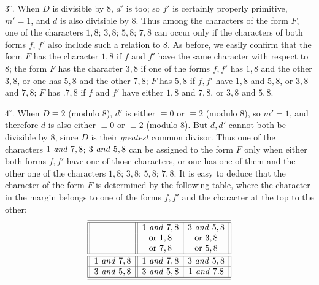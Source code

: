 $3^{\circ}$. When $D$ is divisible by $8$, $d'$ is too; so $f'$ is certainly properly primitive, $m'=1$, and $d$ is also divisible by $8$. Thus among the characters of the form $F$, one of the characters $1,8$; $3,8$; $5,8$; $7,8$ can occur only if the characters of both forms $f$, $f'$ also include such a relation to $8$. As before, we easily confirm that the form $F$ has the character $1,8$ if $f$ and $f'$ have the same character with respect to $8$; the form $F$ has the character $3,8$ if one of the forms $f,f'$ has $1,8$ and the other $3,8$, or one has $5,8$ and the other $7,8$; $F$ has $5,8$ if $f,f'$ have $1,8$ and $5,8$, or $3,8$ and $7,8$; $F$ has $.7,8$ if $f$ and $f'$ have either $1,8$ and $7,8$, or $3,8$ and $5,8$.

$4^{\circ}$. When $D\equiv2$ (modulo $8$), $d'$ is either $\equiv0$ or $\equiv2$ (modulo $8$), so $m'=1$, and therefore $d$ is also either $\equiv0$ or $\equiv2$ (modulo $8$). But $d,d'$ cannot both be divisible by $8$, since $D$ is their \textit{greatest} common divisor. Thus one of the characters $1\text{ \textit{and} }7,8$; $3\text{ \textit{and} }5,8$ can be assigned to the form $F$ only when either both forms $f,f'$ have one of those characters, or one has one of them and the other one of the characters $1,8$; $3,8$; $5,8$; $7,8$. It is easy to deduce that the character of the form $F$ is determined by the following table, where the character in the margin belongs to one of the forms $f,f'$ and the character at the top to the other:
\[
\begin{array}{||c||c|c||}
\hline\hline
 & 1\text{ \textit{and} }7,8 & 3\text{ \textit{and} }5,8 \\
 & \text{or }1,8 & \text{or }3,8 \\
 & \text{or }7,8 & \text{or }5,8 \\
\hline\hline
1\text{ \textit{and} }7,8 & 1\text{ \textit{and} }7,8 & 3\text{ \textit{and} }5,8 \\
\hline
3\text{ \textit{and} }5,8 & 3\text{ \textit{and} }5,8 & 1\text{ \textit{and} }7.8 \\
\hline\hline
\end{array}
\]

